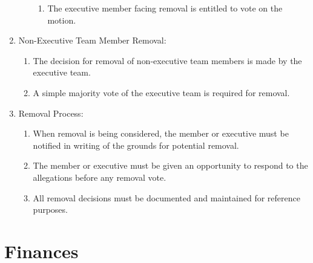\documentclass[12pt,a4paper]{article}
\begin{document}
\begin{enumerate}
\begin{enumerate}
\begin{enumerate}
\item The executive member facing removal is entitled to vote on the motion.
\end{enumerate}
\end{enumerate}

\item Non-Executive Team Member Removal:

\begin{enumerate}
\item The decision for removal of non-executive team members is made by the executive team.

\item A simple majority vote of the executive team is required for removal.
\end{enumerate}

\item Removal Process:

\begin{enumerate}
\item When removal is being considered, the member or executive must be notified in writing of the grounds for potential removal.

\item The member or executive must be given an opportunity to respond to the allegations before any removal vote.

\item All removal decisions must be documented and maintained for reference purposes.
\end{enumerate}
\end{enumerate}

\section{Finances}
\end{document}
